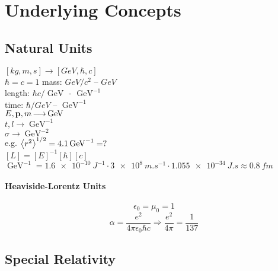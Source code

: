 \documentclass[a4paper]{article}
\DeclareMathOperator{\ra}{\rightarrow}
\DeclareMathOperator{\lra}{\longrightarrow}
\DeclareMathOperator{\dra}{\Rightarrow}
\DeclareMathOperator{\GeV}{\si{GeV}}
\numberwithin{equation}{section}
\begin{document}
\section{Underlying Concepts}
\subsection{Natural Units}
$ [kg, m, s] \ra [\si{GeV}, \hbar, c] $\\
$ \hbar = c = 1 $
mass: $ \si{GeV}/c^2 $ -- $ \si{GeV} $\\
length: $ \hbar c/\GeV $ - $ \GeV^{-1} $\\
time: $ \hbar/\si{GeV} $ -- $ \GeV^{-1} $\\

$ E, \vb{p}, m \lra \GeV $\\
$ t, l \lra \GeV^{-1} $\\
$ \sigma \lra \GeV^{-2} $\\

e.g. $ \ev{r^2}^{1/2} = 4.1\GeV^{-1} = ? $\\
$ [L] = [E]^{-1}[\hbar][c] $\\
$ \GeV^{-1} = \SI{1.6e-10}{J^{-1}}\cdot\SI{3e8}{m.s^{-1}}\cdot\SI{1.055e-34}{J.s} \approx \SI{0.8}{fm} $\\
\paragraph{Heaviside-Lorentz Units}
\begin{equation}\label{key}
\epsilon_0 = \mu_0 = 1
\end{equation}
\begin{equation}\label{key}
\alpha = \dfrac{e^2}{4\pi\epsilon_0\hbar c} \dra \dfrac{e^2}{4\pi} = \dfrac{1}{137}
\end{equation}

\subsection{Special Relativity}
\end{document}
